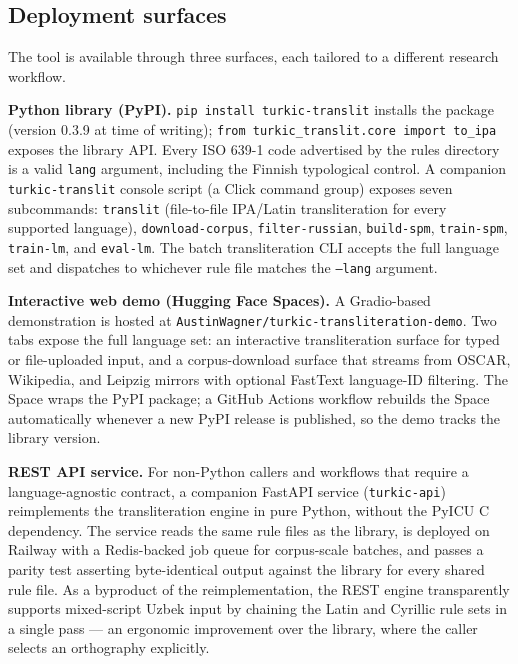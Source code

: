 \subsection{Deployment surfaces}
\label{sec:ipa-deployment}

The tool is available through three surfaces, each tailored to a different research workflow.

\textbf{Python library (PyPI).} \texttt{pip install turkic-translit} installs the package (version 0.3.9 at time of writing); \texttt{from turkic\_translit.core import to\_ipa} exposes the library API. Every ISO 639-1 code advertised by the rules directory is a valid \texttt{lang} argument, including the Finnish typological control. A companion \texttt{turkic-translit} console script (a Click command group) exposes seven subcommands: \texttt{translit} (file-to-file IPA/Latin transliteration for every supported language), \texttt{download-corpus}, \texttt{filter-russian}, \texttt{build-spm}, \texttt{train-spm}, \texttt{train-lm}, and \texttt{eval-lm}. The batch transliteration CLI accepts the full language set and dispatches to whichever rule file matches the \texttt{--lang} argument.

\textbf{Interactive web demo (Hugging Face Spaces).} A Gradio-based demonstration is hosted at \texttt{AustinWagner/turkic-transliter\-ation-demo}. Two tabs expose the full language set: an interactive transliteration surface for typed or file-uploaded input, and a corpus-download surface that streams from OSCAR, Wikipedia, and Leipzig mirrors with optional FastText language-ID filtering. The Space wraps the PyPI package; a GitHub Actions workflow rebuilds the Space automatically whenever a new PyPI release is published, so the demo tracks the library version.

\textbf{REST API service.} For non-Python callers and workflows that require a language-agnostic contract, a companion FastAPI service (\texttt{turkic-api}) reimplements the transliteration engine in pure Python, without the PyICU C dependency. The service reads the same rule files as the library, is deployed on Railway with a Redis-backed job queue for corpus-scale batches, and passes a parity test asserting byte-identical output against the library for every shared rule file. As a byproduct of the reimplementation, the REST engine transparently supports mixed-script Uzbek input by chaining the Latin and Cyrillic rule sets in a single pass — an ergonomic improvement over the library, where the caller selects an orthography explicitly.

